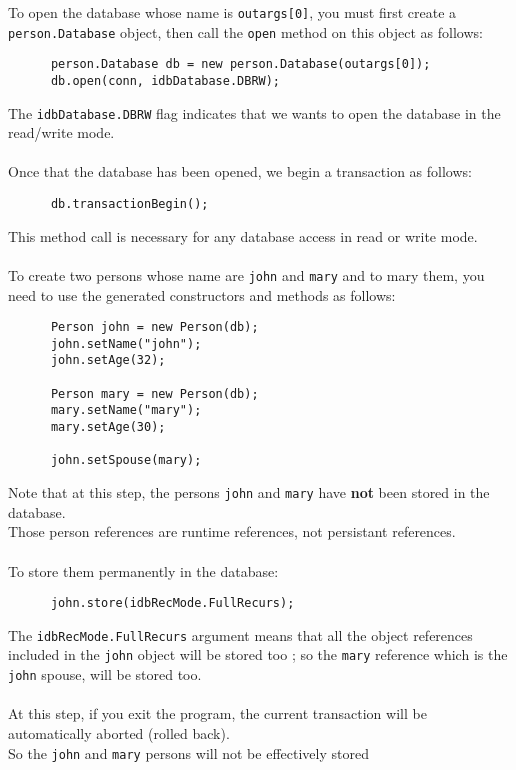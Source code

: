 To open the database whose name is \texttt{outargs[0]}, you must first
create a \texttt{person.Database} object, then call the \texttt{open}
method on this object as follows:
{\verbsize \begin{verbatim}
      person.Database db = new person.Database(outargs[0]);
      db.open(conn, idbDatabase.DBRW);
\end{verbatim}
}
The \texttt{idbDatabase.DBRW} flag indicates that we wants to open
the database in the read/write mode.
\\
\\
Once that the database has been opened, we begin a transaction as follows:
{\verbsize \begin{verbatim}
      db.transactionBegin();
\end{verbatim}
}
This method call is necessary for any database access in read or write
mode.
\\
\\
To create two persons whose name are \texttt{john} and \texttt{mary} and
to mary them, you need to use the generated constructors and methods
as follows:
{\verbsize \begin{verbatim}
      Person john = new Person(db);
      john.setName("john");
      john.setAge(32);
     
      Person mary = new Person(db);
      mary.setName("mary");
      mary.setAge(30);
     
      john.setSpouse(mary);
\end{verbatim}
}
Note that at this step, the persons \texttt{john} and \texttt{mary} have
{\bf not} been stored in the database.
\\
Those person references are runtime references, not persistant references.
\\
\\
To store them permanently in the database:
{\verbsize \begin{verbatim}
      john.store(idbRecMode.FullRecurs);
\end{verbatim}
}
The \texttt{idbRecMode.FullRecurs} argument means that all the object
references included in the \texttt{john} object will be stored too ; so
the \texttt{mary} reference which is the \texttt{john} spouse, will be stored too.
\\
\\
At this step, if you exit the program, the current transaction will
be automatically aborted (rolled back).
\\
So the \texttt{john} and \texttt{mary} persons will not be effectively stored
